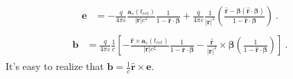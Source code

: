 \documentclass[letterpaper,10pt,english]{jupyterBook}
\begin{document}
\begin{equation*}
\begin{split}\begin{aligned}
  \mathbf{e} 
  & = - \frac{q}{4 \pi \varepsilon} \frac{\mathbf{a}_s(t_{ret})}{|\mathbf{r}| c^2} \frac{1}{1 - \hat{\mathbf{r}} \cdot \boldsymbol\beta} + \frac{q}{4 \pi \varepsilon} \frac{1}{|\mathbf{r}|^2} \left( \frac{ \hat{\mathbf{r}} - \boldsymbol\beta (\hat{\mathbf{r}} \cdot \boldsymbol\beta) }{1 - \hat{\mathbf{r}} \cdot \boldsymbol\beta} \right) \ .
\end{aligned}\end{split}
\end{equation*}\begin{equation*}
\begin{split}\begin{aligned}
  \mathbf{b} 
  & = \frac{q}{4 \pi \varepsilon} \frac{1}{c} \left[ -\frac{\hat{\mathbf{r}} \times \mathbf{a}_s(t_{ret})}{|\mathbf{r}| c^2} \frac{1}{1-\hat{\mathbf{r}} \cdot \boldsymbol\beta} - \frac{\hat{\mathbf{r}}}{|\mathbf{r}|^2} \times \boldsymbol\beta \left( \frac{1}{1 - \hat{\mathbf{r}} \cdot \boldsymbol\beta} \right)  \right] \ .
\end{aligned}\end{split}
\end{equation*}
\sphinxAtStartPar
It’s easy to realize that \(\mathbf{b} = \frac{1}{c} \hat{\mathbf{r}} \times \mathbf{e}\).
\end{document}
